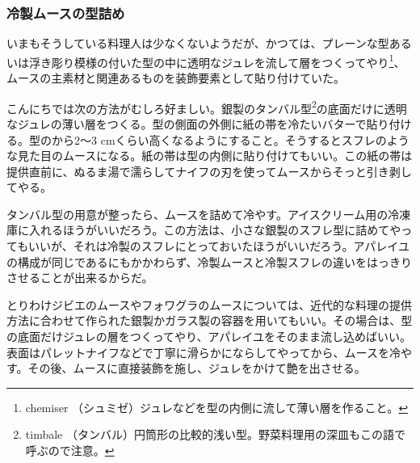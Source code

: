 \begin{recette}
{\subsubsection{冷製ムースの型詰め}\label{moulage-des-mousses-froides}}



いまもそうしている料理人は少なくないようだが、かつては、プレーンな型あるいは浮き彫り模様の付いた型の中に透明なジュレを流して層をつくってやり\footnote{chemiser
  （シュミゼ）ジュレなどを型の内側に流して薄い層を作ること。}、ムースの主素材と関連あるものを装飾要素として貼り付けていた。

こんにちでは次の方法がむしろ好ましい。銀製のタンバル型\footnote{timbale
  （タンバル）円筒形の比較的浅い型。野菜料理用の深皿もこの語で呼ぶので注意。}の底面だけに透明なジュレの薄い層をつくる。型の側面の外側に紙の帯を冷たいバターで貼り付ける。型のから2〜3
cmくらい高くなるようにすること。そうするとスフレのような見た目のムースになる。紙の帯は型の内側に貼り付けてもいい。この紙の帯は提供直前に、ぬるま湯で濡らしてナイフの刃を使ってムースからそっと引き剥してやる。

タンバル型の用意が整ったら、ムースを詰めて冷やす。アイスクリーム用の冷凍庫に入れるほうがいいだろう。この方法は、小さな銀製のスフレ型に詰めてやってもいいが、それは冷製のスフレにとっておいたほうがいいだろう。アパレイユの構成が同じであるにもかかわらず、冷製ムースと冷製スフレの違いをはっきりさせることが出来るからだ。

とりわけジビエのムースやフォワグラのムースについては、近代的な料理の提供方法に合わせて作られた銀製かガラス製の容器を用いてもいい。その場合は、型の底面だけジュレの層をつくってやり、アパレイユをそのまま流し込めばいい。表面はパレットナイフなどで丁寧に滑らかにならしてやってから、ムースを冷やす。その後、ムースに直接装飾を施し、ジュレをかけて艶を出させる。


\end{recette}
